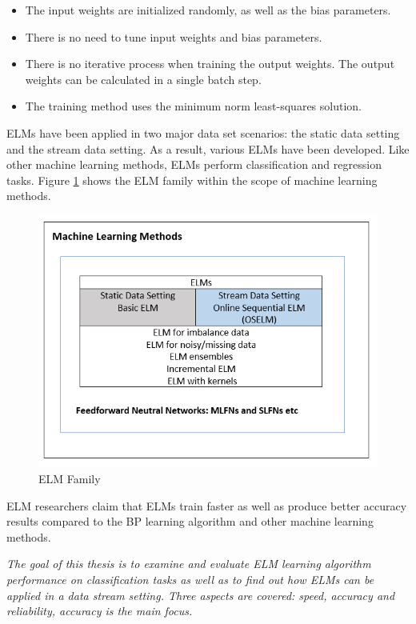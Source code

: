 \documentclass[a4paper, 14pt]{extarticle}
\begin{document}
\begin{itemize}
    \item The input weights are initialized randomly, as well as the bias parameters. 
    \item There is no need to tune input weights and bias parameters. 
    \item There is no iterative process when training the output weights. The output weights can be calculated in a single batch step. 
    \item The training method uses the minimum norm least-squares solution.
\end{itemize}
ELMs have been applied in two major data set scenarios: the static data setting and the stream data setting. As a result, various ELMs have been developed. Like other machine learning methods, ELMs perform classification and regression tasks. Figure \ref{fig:machine learning} shows the ELM family within the scope of machine learning methods. 
\begin{figure}[H]
\centering
\includegraphics[width=\textwidth]{1.png}
\caption{\label{fig:machine learning}ELM Family}
\end{figure}
ELM researchers claim that ELMs train faster as well as produce better accuracy results compared to the BP learning algorithm and other machine learning methods. \newline
\par  \textit{The goal of this thesis is to examine and evaluate ELM learning algorithm performance on classification tasks as well as to find out how ELMs can be applied in a data stream setting. Three aspects are covered: speed, accuracy and reliability, accuracy is the main focus.} \newline
\end{document}
